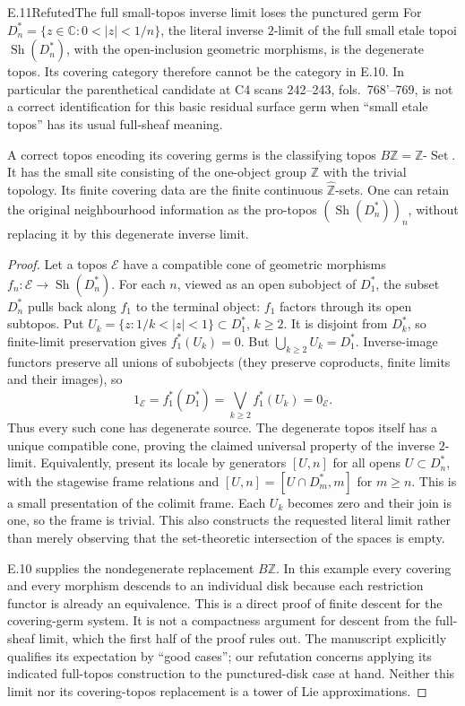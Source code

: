 \begin{statement}{E.11}{Refuted}{The full small-topos inverse limit loses the punctured germ}
For $D_n^*=\{z\in\mathbb C:0<|z|<1/n\}$, the literal inverse
$2$-limit of the full small etale topoi
$\operatorname{Sh}(D_n^*)$, with the open-inclusion geometric
morphisms, is the degenerate topos.  Its covering category therefore
cannot be the category in E.10.  In particular the parenthetical
candidate at C4 scans 242--243, fols.~768'--769, is not a correct
identification for this basic residual surface germ when ``small
etale topos'' has its usual full-sheaf meaning.

A correct topos encoding its covering germs is the classifying
topos $B\mathbb Z=\mathbb Z\text{-}\operatorname{Set}$.  It has the
small site consisting of the one-object group $\mathbb Z$ with the
trivial topology.  Its finite covering data are the finite continuous
$\widehat{\mathbb Z}$-sets.  One can retain the original neighbourhood
information as the pro-topos $(\operatorname{Sh}(D_n^*))_n$, without
replacing it by this degenerate inverse limit.
\end{statement}
\begin{proof}
Let a topos $\mathcal E$ have a compatible cone of geometric
morphisms $f_n:\mathcal E\to\operatorname{Sh}(D_n^*)$.
For each $n$, viewed as an open subobject of $D_1^*$, the subset
$D_n^*$ pulls back along $f_1$ to the terminal object: $f_1$ factors
through its open subtopos.  Put
$U_k=\{z:1/k<|z|<1\}\subset D_1^*$, $k\geq2$.
It is disjoint from $D_k^*$, so finite-limit preservation gives
$f_1^*(U_k)=0$.  But $\bigcup_{k\geq2}U_k=D_1^*$.
Inverse-image functors preserve all unions of subobjects (they
preserve coproducts, finite limits and their images), so
\[
 1_{\mathcal E}=f_1^*(D_1^*)=
       \bigvee_{k\geq2}f_1^*(U_k)=0_{\mathcal E}.
\]
Thus every such cone has degenerate source.  The degenerate topos
itself has a unique compatible cone, proving the claimed universal
property of the inverse $2$-limit.
Equivalently, present its locale by generators $[U,n]$ for all
opens $U\subset D_n^*$, with the stagewise frame relations and
$[U,n]=[U\cap D_m^*,m]$ for $m\geq n$.  This is a small presentation
of the colimit frame.  Each $U_k$ becomes zero and their join is
one, so the frame is trivial.  This also constructs the requested
literal limit rather than merely observing that the set-theoretic
intersection of the spaces is empty.

E.10 supplies the nondegenerate replacement $B\mathbb Z$.  In this
example every covering and every morphism descends to an individual
disk because each restriction functor is already an equivalence.
This is a direct proof of finite descent for the covering-germ
system.  It is not a compactness argument for descent from the
full-sheaf limit, which the first half of the proof rules out.
The manuscript explicitly qualifies its expectation by ``good cases'';
our refutation concerns applying its indicated full-topos construction
to the punctured-disk case at hand.  Neither this limit nor its
covering-topos replacement is a tower of Lie approximations.
\end{proof}

